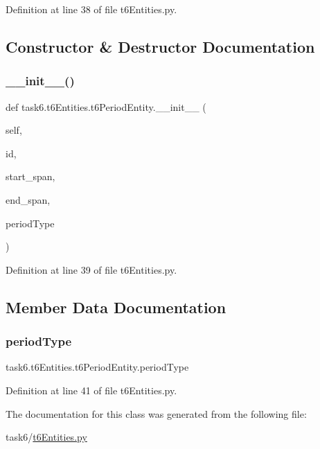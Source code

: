 Definition at line 38 of file t6\+Entities.\+py.



\subsection{Constructor \& Destructor Documentation}
\mbox{\label{classtask6_1_1t6Entities_1_1t6PeriodEntity_a447a8538b93c2116de30aa47eccfcbec}} 
\subsubsection{\texorpdfstring{\+\_\+\+\_\+init\+\_\+\+\_\+()}{\_\_init\_\_()}}
{\footnotesize\ttfamily def task6.\+t6\+Entities.\+t6\+Period\+Entity.\+\_\+\+\_\+init\+\_\+\+\_\+ (\begin{DoxyParamCaption}\item[{}]{self,  }\item[{}]{id,  }\item[{}]{start\+\_\+span,  }\item[{}]{end\+\_\+span,  }\item[{}]{period\+Type }\end{DoxyParamCaption})}



Definition at line 39 of file t6\+Entities.\+py.



\subsection{Member Data Documentation}
\mbox{\label{classtask6_1_1t6Entities_1_1t6PeriodEntity_ae2f4d463fe5601083ce5ce3070690f1d}} 
\subsubsection{\texorpdfstring{period\+Type}{periodType}}
{\footnotesize\ttfamily task6.\+t6\+Entities.\+t6\+Period\+Entity.\+period\+Type}



Definition at line 41 of file t6\+Entities.\+py.



The documentation for this class was generated from the following file\+:\begin{DoxyCompactItemize}
\item 
task6/\hyperlink{t6Entities_8py}{t6\+Entities.\+py}\end{DoxyCompactItemize}
